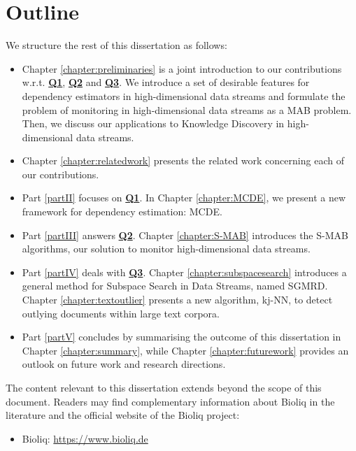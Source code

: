 \section{Outline}

We structure the rest of this dissertation as follows: 

\begin{itemize}
	\item Chapter \ref{chapter:preliminaries} is a joint introduction to our contributions w.r.t. \hyperlink{Q1}{\textbf{Q1}}, \hyperlink{Q2}{\textbf{Q2}} and \hyperlink{Q3}{\textbf{Q3}}. We introduce a set of desirable features for dependency estimators in high-dimensional data streams and formulate the problem of monitoring in high-dimensional data streams as a \acrfull{MAB} problem. Then, we discuss our applications to Knowledge Discovery in high-dimensional data streams.
	\item Chapter \ref{chapter:relatedwork} presents the related work concerning each of our contributions. 
	\item Part \ref{partII} focuses on \hyperlink{Q1}{\textbf{Q1}}. In Chapter \ref{chapter:MCDE}, we present a new framework for dependency estimation: \acrfull{MCDE}. 
	\item Part \ref{partIII} answers \hyperlink{Q2}{\textbf{Q2}}. Chapter \ref{chapter:S-MAB} introduces the \acrfull{S-MAB} algorithms, our solution to monitor high-dimensional data streams. 
	\item Part \ref{partIV} deals with \hyperlink{Q3}{\textbf{Q3}}. Chapter \ref{chapter:subspacesearch} introduces a general method for Subspace Search in Data Streams, named \acrfull{SGMRD}. Chapter \ref{chapter:textoutlier} presents a new algorithm, \acrfull{kj-NN}, to detect outlying documents within large text corpora.
	\item Part \ref{partV} concludes by summarising the outcome of this dissertation in Chapter \ref{chapter:summary}, while Chapter \ref{chapter:futurework} provides an outlook on future work and research directions.  
\end{itemize}

The content relevant to this dissertation extends beyond the scope of this document. Readers may find complementary information about Bioliq in the literature \cite{pfitzer2016fast} and the official website of the Bioliq project: 
\begin{itemize}
	\item Bioliq: \url{https://www.bioliq.de}
\end{itemize}

